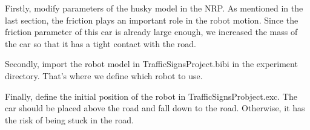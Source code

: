 Firstly, modify parameters of the husky model in the NRP. As mentioned in the last section, the friction plays an important role in the robot motion. Since the friction parameter of this car is already large enough, we increased the mass of the car so that it has a tight contact with the road.


Secondly, import the robot model in TrafficSignsProject.bibi in the experiment directory. That's where we define which robot to use.


Finally, define the initial position of the robot in TrafficSignsProbject.exc. The car should be placed above the road and fall down to the road. Otherwise, it has the risk of being stuck in the road.



